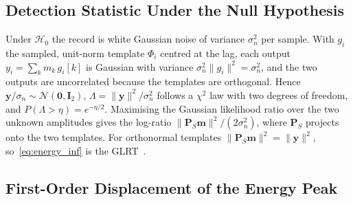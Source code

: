 \subsection{Detection Statistic Under the Null Hypothesis}\label{app:h0}

Under $\mathcal{H}_0$ the record is white Gaussian noise of variance $\sigma_n^2$ per sample. With $g_i$ the sampled, unit-norm template $\Phi_i$ centred at the lag, each output $y_i = \sum_k m_k\, g_i[k]$ is Gaussian with variance $\sigma_n^2\|g_i\|^2 = \sigma_n^2$, and the two outputs are uncorrelated because the templates are orthogonal. Hence $\mathbf{y}/\sigma_n \sim \mathcal{N}(\mathbf{0}, \mathbf{I}_2)$, $\Lambda = \|\mathbf{y}\|^2/\sigma_n^2$ follows a $\chi^2$ law with two degrees of freedom, and $P(\Lambda > \eta) = e^{-\eta/2}$. Maximising the Gaussian likelihood ratio over the two unknown amplitudes gives the log-ratio $\|\mathbf{P}_S\mathbf{m}\|^2/(2\sigma_n^2)$, where $\mathbf{P}_S$ projects onto the two templates. For orthonormal templates $\|\mathbf{P}_S\mathbf{m}\|^2 = \|\mathbf{y}\|^2$, so~\eqref{eq:energy_inf} is the GLRT~\cite{kay1998detection,scharf1994matched}.

\subsection{First-Order Displacement of the Energy Peak}\label{app:ep_shift}

